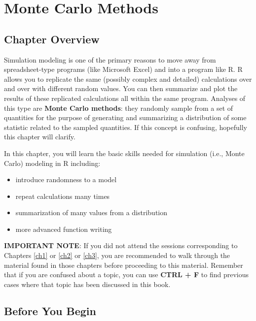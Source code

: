 \documentclass[]{book}
\providecommand{\tightlist}{%
  \setlength{\itemsep}{0pt}\setlength{\parskip}{0pt}}
\theoremstyle{definition}
\theoremstyle{definition}
\theoremstyle{definition}
\theoremstyle{remark}
\begin{document}
\chapter{Monte Carlo Methods}\label{ch4}

\section*{Chapter Overview}\label{chapter-overview-3}

Simulation modeling is one of the primary reasons to move away from
spreadsheet-type programs (like Microsoft Excel) and into a program like
R. R allows you to replicate the same (possibly complex and detailed)
calculations over and over with different random values. You can then
summarize and plot the results of these replicated calculations all
within the same program. Analyses of this type are \textbf{Monte Carlo
methods}: they randomly sample from a set of quantities for the purpose
of generating and summarizing a distribution of some statistic related
to the sampled quantities. If this concept is confusing, hopefully this
chapter will clarify.

In this chapter, you will learn the basic skills needed for simulation
(i.e., Monte Carlo) modeling in R including:

\begin{itemize}
\tightlist
\item
  introduce randomness to a model
\item
  repeat calculations many times
\item
  summarization of many values from a distribution
\item
  more advanced function writing
\end{itemize}

\textbf{IMPORTANT NOTE}: If you did not attend the sessions
corresponding to Chapters \ref{ch1} or \ref{ch2} or \ref{ch3}, you are
recommended to walk through the material found in those chapters before
proceeding to this material. Remember that if you are confused about a
topic, you can use \textbf{CTRL + F} to find previous cases where that
topic has been discussed in this book.

\section*{Before You Begin}\label{before-you-begin-2}
\end{document}
